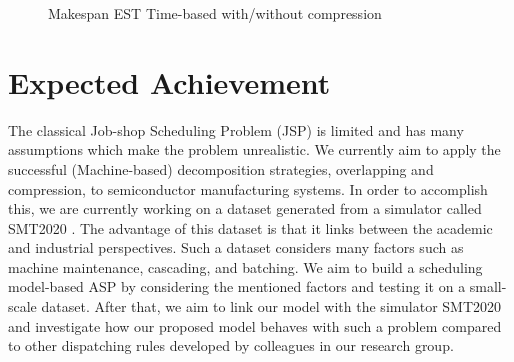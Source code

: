 \documentclass[submission,copyright,creativecommons]{eptcs}
\begin{document}
\begin{figure}
  \caption{Makespan EST Time-based with/without compression}
  \label{fig:figure03}
\end{figure}

\section{Expected Achievement}
The classical Job-shop Scheduling Problem (JSP) is limited and has many assumptions which make the problem unrealistic. We currently aim to apply the successful (Machine-based) decomposition strategies, overlapping and compression, to semiconductor manufacturing systems. In order to accomplish this, we are currently working on a dataset generated from a simulator called SMT2020 \cite{kopp2020smt2020}. The advantage of this dataset is that it links between the academic and industrial perspectives. Such a dataset considers many factors such as machine maintenance, cascading, and batching. We aim to build a scheduling model-based ASP by considering the mentioned factors and testing it on a small-scale dataset. After that, we aim to link our model with the simulator SMT2020 and investigate how our proposed model behaves with such a problem compared to other dispatching rules developed by colleagues in our research group. 

\nocite{*}


\end{document}
